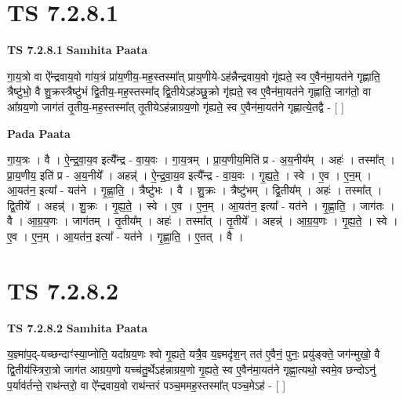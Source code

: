 \documentclass[17pt]{extarticle}
\begin{document}

\section{ TS 7.2.8.1 }

\textbf{TS 7.2.8.1 } \newline
\textbf{Samhita Paata} \newline

गा॒य॒त्रो वा ऐ᳚न्द्रवाय॒वो गा॑य॒त्रं प्रा॑य॒णीय॒-मह॒स्तस्मा᳚त् प्राय॒णीये-ऽह॑न्नैन्द्रवाय॒वो गृ॑ह्यते॒ स्व ए॒वैन॑मा॒यत॑ने गृह्णाति॒ त्रैष्टु॑भो॒ वै शु॒क्रस्त्रैष्टु॑भं द्वि॒तीय॒-मह॒स्तस्मा᳚द् द्वि॒तीयेऽह॑ञ्छु॒क्रो गृ॑ह्यते॒ स्व ए॒वैन॑मा॒यत॑ने गृह्णाति॒ जाग॑तो॒ वा आ᳚ग्रय॒णो जाग॑तं तृ॒तीय॒-मह॒स्तस्मा᳚त् तृ॒तीयेऽह॑न्नाग्रय॒णो गृ॑ह्यते॒ स्व ए॒वैन॑मा॒यत॑ने गृह्णात्ये॒तद्वै - [  ] \newline

\textbf{Pada Paata} \newline

गा॒य॒त्रः । वै । ऐ॒न्द्र॒वा॒य॒व इत्यै᳚न्द्र - वा॒य॒वः । गा॒य॒त्रम् । प्रा॒य॒णीय॒मिति॑ प्र - अ॒य॒नीय᳚म् । अहः॑ । तस्मा᳚त् । प्रा॒य॒णीय॒ इति॑ प्र - अ॒य॒नीये᳚ । अहन्न्॑ । ऐ॒न्द्र॒वा॒य॒व इत्यै᳚न्द्र - वा॒य॒वः । गृ॒ह्य॒ते॒ । स्वे । ए॒व । ए॒न॒म् । आ॒यत॑न॒ इत्या᳚ - यत॑ने । गृ॒ह्णा॒ति॒ । त्रैष्टु॑भः । वै । शु॒क्रः । त्रैष्टु॑भम् । द्वि॒तीय᳚म् । अहः॑ । तस्मा᳚त् । द्वि॒तीये᳚ । अहन्न्॑ । शु॒क्रः । गृ॒ह्य॒ते॒ । स्वे । ए॒व । ए॒न॒म् । आ॒यत॑न॒ इत्या᳚ - यत॑ने । गृ॒ह्णा॒ति॒ । जाग॑तः । वै । आ॒ग्र॒य॒णः । जाग॑तम् । तृ॒तीय᳚म् । अहः॑ । तस्मा᳚त् । तृ॒तीये᳚ । अहन्न्॑ । आ॒ग्र॒य॒णः । गृ॒ह्य॒ते॒ । स्वे । ए॒व । ए॒न॒म् । आ॒यत॑न॒ इत्या᳚ - यत॑ने । गृ॒ह्णा॒ति॒ । ए॒तत् । वै ।  \newline





\section{ TS 7.2.8.2 }

\textbf{TS 7.2.8.2 } \newline
\textbf{Samhita Paata} \newline

य॒ज्ञ्मा॑प॒द्-यच्छन्दाꣳ॑स्या॒प्नोति॒ यदा᳚ग्रय॒णः श्वो गृ॒ह्यते॒ यत्रै॒व य॒ज्ञ्मदृ॑श॒न् तत॑ ए॒वैनं॒ पुनः॒ प्रयु॑ङ्क्ते॒ जग॑न्मुखो॒ वै द्वि॒तीय॑स्त्रिरा॒त्रो जाग॑त आग्रय॒णो यच्च॑तु॒र्थेऽह॑न्नाग्रय॒णो गृ॒ह्यते॒ स्व ए॒वैन॑मा॒यत॑ने गृह्णा॒त्यथो॒ स्वमे॒व छन्दोऽनु॑ प॒र्याव॑र्तन्ते॒ राथ॑न्तरो॒ वा ऐ᳚न्द्रवाय॒वो राथ॑न्तरं पञ्च॒ममह॒स्तस्मा᳚त् पञ्च॒मेऽह॑ - [  ] \newline
\end{document}
